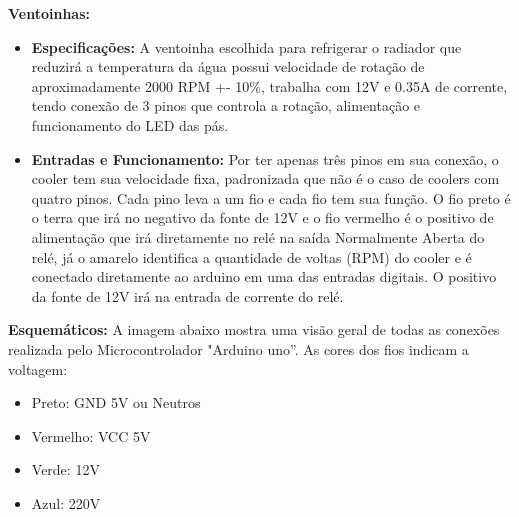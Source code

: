 \newpage
\textbf{Ventoinhas:}
\begin{itemize}
    \item \textbf{Especificações:} A ventoinha escolhida para refrigerar o radiador que reduzirá a temperatura da água possui velocidade de rotação de aproximadamente 2000 RPM +- 10\%, trabalha com 12V e 0.35A de corrente, tendo conexão de 3 pinos que controla a rotação, alimentação e funcionamento do LED das pás.

    \item \textbf{Entradas e Funcionamento:} Por ter apenas três pinos em sua conexão, o cooler tem sua velocidade fixa, padronizada que não é o caso de coolers com quatro pinos. Cada pino leva a um fio e cada fio tem sua função. O fio preto é o terra que irá no negativo da fonte de 12V e o fio vermelho é o positivo de alimentação que irá diretamente no relé na saída Normalmente Aberta do relé, já o amarelo identifica a quantidade de voltas (RPM) do cooler e é conectado diretamente ao arduino em uma das entradas digitais. O positivo da fonte de 12V irá na entrada de corrente do relé.
\end{itemize}

\textbf{Esquemáticos:}
A imagem abaixo mostra uma visão geral de todas as conexões realizada pelo Microcontrolador "Arduino uno”. As cores dos fios indicam a voltagem:
\begin{itemize}
    \item Preto: GND 5V ou Neutros 
    \item Vermelho: VCC 5V 
    \item Verde: 12V 
    \item Azul: 220V
\end{itemize}

